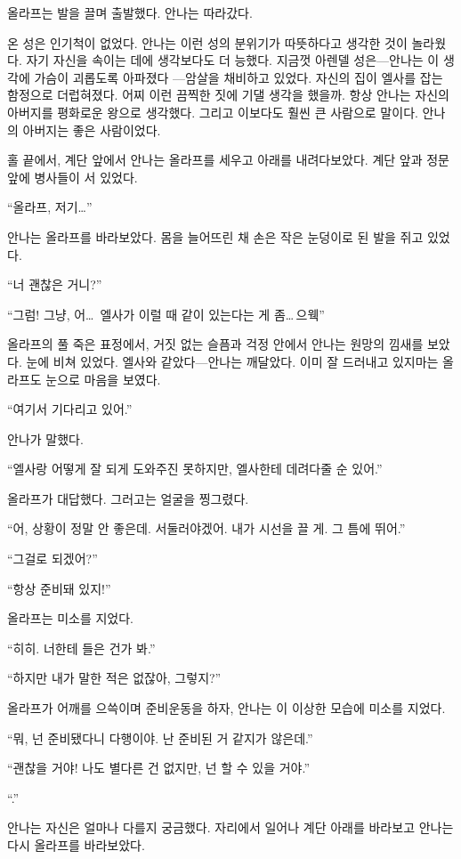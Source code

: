 올라프는 발을 끌며 출발했다. 안나는 따라갔다.

온 성은 인기척이 없었다. 안나는 이런 성의 분위기가 따뜻하다고 생각한 것이 놀라웠다. 자기 자신을 속이는 데에 생각보다도 더 능했다. 지금껏 아렌델 성은—안나는 이 생각에 가슴이 괴롭도록 아파졌다 —암살을 채비하고 있었다. 자신의 집이 엘사를 잡는 함정으로 더럽혀졌다. 어찌 이런 끔찍한 짓에 기댈 생각을 했을까. 항상 안나는 자신의 아버지를 평화로운 왕으로 생각했다. 그리고 이보다도 훨씬 큰 사람으로 말이다. 안나의 아버지는 좋은 사람이었다.

홀 끝에서, 계단 앞에서 안나는 올라프를 세우고 아래를 내려다보았다. 계단 앞과 정문 앞에 병사들이 서 있었다.

``올라프, 저기\ldots''

안나는 올라프를 바라보았다. 몸을 늘어뜨린 채 손은 작은 눈덩이로 된 발을 쥐고 있었다.

``너 괜찮은 거니?''

``그럼! 그냥, 어\ldots\, 엘사가 이럴 때 같이 있는다는 게 좀\ldots\,으웩''

올라프의 풀 죽은 표정에서, 거짓 없는 슬픔과 걱정 안에서 안나는 원망의 낌새를 보았다. 눈에 비쳐 있었다. 엘사와 같았다—안나는 깨달았다. 이미 잘 드러내고 있지마는 올라프도 눈으로 마음을 보였다.

``여기서 기다리고 있어.''

안나가 말했다.

``엘사랑 어떻게 잘 되게 도와주진 못하지만, 엘사한테 데려다줄 순 있어.''

올라프가 대답했다. 그러고는 얼굴을 찡그렸다.

``어, 상황이 정말 안 좋은데. 서둘러야겠어. 내가 시선을 끌 게. 그 틈에 뛰어.''

``그걸로 되겠어?''

``항상 준비돼 있지!''

올라프는 미소를 지었다.

``히히. 너한테 들은 건가 봐.''

``하지만 내가 말한 적은 없잖아, 그렇지?''

올라프가 어깨를 으쓱이며 준비운동을 하자, 안나는 이 이상한 모습에 미소를 지었다.

``뭐, 넌 준비됐다니 다행이야. 난 준비된 거 같지가 않은데.''

``괜찮을 거야! 나도 별다른 건 없지만, 넌 할 수 있을 거야.''

``.''

안나는 자신은 얼마나 다를지 궁금했다. 자리에서 일어나 계단 아래를 바라보고 안나는 다시 올라프를 바라보았다.

